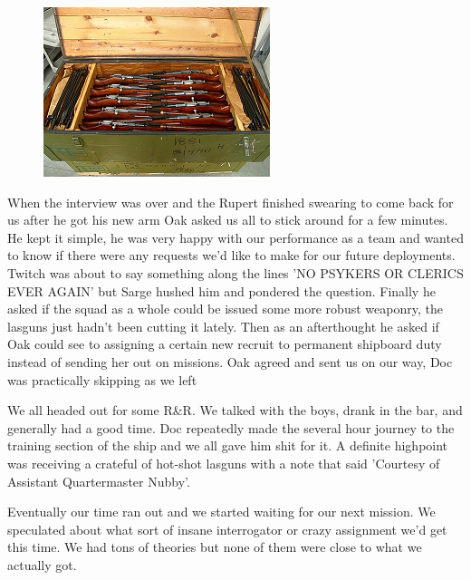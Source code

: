\begin{figure}
	\begin{center}
		\includegraphics[width=\figwidth]{pics/6/55.png}
	\end{center}
\end{figure}
When the interview was over and the Rupert finished swearing to come back for us after he got his new arm Oak asked us all to stick around for a few minutes. 
He kept it simple, he was very happy with our performance as a team and wanted to know if there were any requests we'd like to make for our future deployments. 
Twitch was about to say something along the lines 'NO PSYKERS OR CLERICS EVER AGAIN' but Sarge hushed him and pondered the question. 
Finally he asked if the squad as a whole could be issued some more robust weaponry, the lasguns just hadn't been cutting it lately. 
Then as an afterthought he asked if Oak could see to assigning a certain new recruit to permanent shipboard duty instead of sending her out on missions. 
Oak agreed and sent us on our way, Doc was practically skipping as we left

We all headed out for some R\&R. 
We talked with the boys, drank in the bar, and generally had a good time. 
Doc repeatedly made the several hour journey to the training section of the ship and we all gave him shit for it. 
A definite highpoint was receiving a crateful of hot-shot lasguns with a note that said 'Courtesy of Assistant Quartermaster Nubby'.

Eventually our time ran out and we started waiting for our next mission. 
We speculated about what sort of insane interrogator or crazy assignment we'd get this time. 
We had tons of theories but none of them were close to what we actually got.

